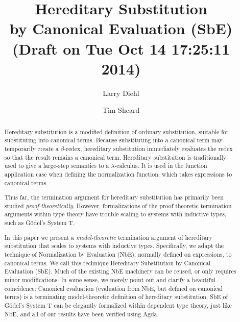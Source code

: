 \documentclass{llncs}
\newcommand{\by}[1]{(#1)}
\begin{document}
\frontmatter
\pagestyle{headings}

\title{
Hereditary Substitution
\\by Canonical Evaluation (SbE)
\\{\small (Draft on Tue Oct 14 17:25:11 2014)}
}

\author{Larry Diehl \and Tim Sheard}


\maketitle

\begin{abstract}

Hereditary substitution is a modified definition of ordinary
substitution, suitable for substituting into canonical terms. Because
substituting into a canonical term may temporarily create a $\beta$-redex,
hereditary substitution immediately evaluates the redex so that the
result remains a canonical term. Hereditary substitution is
traditionally used to give a large-step semantics to a
$\lambda$-calculus. It is used in the function application case when
defining the normalization function, which takes expressions to canonical terms.

Thus far, the termination argument for hereditary substitution has
primarily been studied \textit{proof-theoretically}. However, formalizations of
the proof theoretic termination arguments within type theory have
trouble scaling to systems with inductive types, such as
G{\"o}del's System T.

In this paper we present a \textit{model-theoretic}
termination argument of hereditary substitution that scales to
systems with inductive types. Specifically, we adapt the technique of
Normalization by Evaluation (NbE), normally defined on expressions, to
canonical terms. We call this technique Hereditary Substitution by
Canonical Evaluation (SbE). Much of the existing NbE machinery can be reused, or
only requires minor modifications. In some sense, we merely point out
and clarify a beautiful coincidence: Canonical evaluation (evaluation
from NbE, but defined on canonical terms) is a
terminating model-theoretic definition of hereditary substitution.
SbE of G{\"o}del's System T can be elegantly formalized within
dependent type theory, just like NbE, and all of our results have been
verified using Agda.
\end{abstract}
\end{document}
